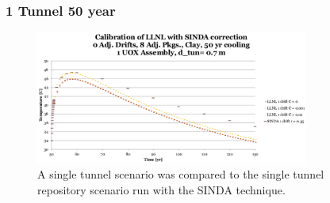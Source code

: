 \begin{frame}[ctb!]
  \frametitle{1 Tunnel 50 year}
  \begin{figure}[h!]
    \begin{center}
      \includegraphics[width=0.8\textwidth]{1drift50yr.eps}
    \end{center}
    \caption{A single tunnel scenario was compared to the single tunnel repository 
    scenario run with the SINDA technique.}
    \label{fig:1drift50yr}
  \end{figure}
  
\end{frame}

